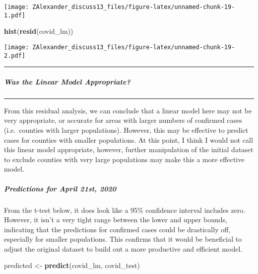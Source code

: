 \documentclass[
]{article}
\newenvironment{Shaded}{\begin{snugshade}}{\end{snugshade}}
\newcommand{\KeywordTok}[1]{\textcolor[rgb]{0.13,0.29,0.53}{\textbf{#1}}}
\newcommand{\NormalTok}[1]{#1}
\newcommand{\StringTok}[1]{\textcolor[rgb]{0.31,0.60,0.02}{#1}}
\begin{document}
\texttt{[image: ZAlexander\_discuss13\_files/figure-latex/unnamed-chunk-19-1.pdf]}

\begin{Shaded}
\begin{Highlighting}[]
\KeywordTok{hist}\NormalTok{(}\KeywordTok{resid}\NormalTok{(covid_lm))}
\end{Highlighting}
\end{Shaded}

\texttt{[image: ZAlexander\_discuss13\_files/figure-latex/unnamed-chunk-19-2.pdf]}

\begin{center}\rule{0.5\linewidth}{0.5pt}\end{center}

\hypertarget{was-the-linear-model-appropriate}{%
\subparagraph{Was the Linear Model
Appropriate?}\label{was-the-linear-model-appropriate}}

\begin{center}\rule{0.5\linewidth}{0.5pt}\end{center}

From this residual analysis, we can conclude that a linear model here
may not be very appropriate, or accurate for areas with larger numbers
of confirmed cases (i.e.~counties with larger populations). However,
this may be effective to predict cases for counties with smaller
populations. At this point, I think I would not call this linear model
appropriate, however, further manipulation of the initial dataset to
exclude counties with very large populations may make this a more
effective model.

\hypertarget{predictions-for-april-21st-2020}{%
\subparagraph{Predictions for April 21st,
2020}\label{predictions-for-april-21st-2020}}

From the t-test below, it does look like a 95\% confidence interval
includes zero. However, it isn't a very tight range between the lower
and upper bounds, indicating that the predictions for confirmed cases
could be drastically off, especially for smaller populations. This
confirms that it would be beneficial to adjust the original dataset to
build out a more productive and efficient model.

\begin{Shaded}
\begin{Highlighting}[]
\NormalTok{predicted <-}\StringTok{ }\KeywordTok{predict}\NormalTok{(covid_lm, covid_test)}
\end{Highlighting}
\end{Shaded}
\end{document}

